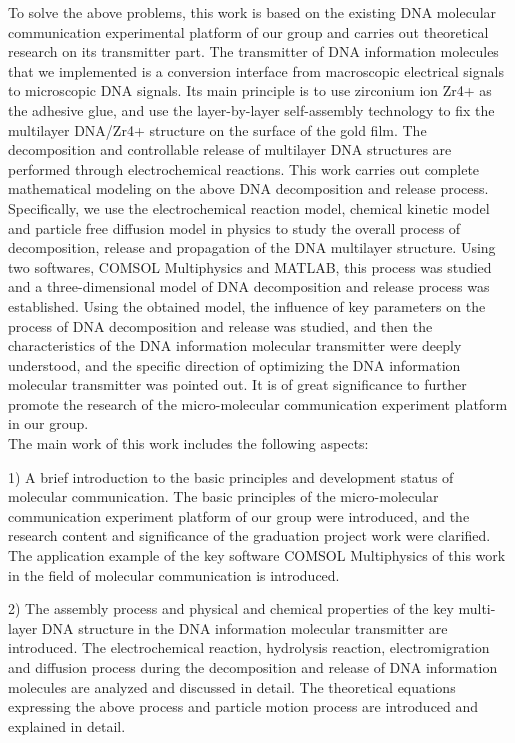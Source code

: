 \begin{abstract*}
To solve the above problems, this work is based on the existing DNA molecular communication experimental platform of our group and carries out theoretical research on its transmitter part. The transmitter of DNA information molecules that we implemented is a conversion interface from macroscopic electrical signals to microscopic DNA signals. Its main principle is to use zirconium ion Zr4+ as the adhesive glue, and use the layer-by-layer self-assembly technology to fix the multilayer DNA/Zr4+ structure on the surface of the gold film. The decomposition and controllable release of multilayer DNA structures are performed through electrochemical reactions. This work carries out complete mathematical modeling on the above DNA decomposition and release process. Specifically, we use the electrochemical reaction model, chemical kinetic model and particle free diffusion model in physics to study the overall process of decomposition, release and propagation of the DNA multilayer structure. Using two softwares, COMSOL Multiphysics and MATLAB, this process was studied and a three-dimensional model of DNA decomposition and release process was established. Using the obtained model, the influence of key parameters on the process of DNA decomposition and release was studied, and then the characteristics of the DNA information molecular transmitter were deeply understood, and the specific direction of optimizing the DNA information molecular transmitter was pointed out. It is of great significance to further promote the research of the micro-molecular communication experiment platform in our group.\\

The main work of this work includes the following aspects:

1) A brief introduction to the basic principles and development status of molecular communication. The basic principles of the micro-molecular communication experiment platform of our group were introduced, and the research content and significance of the graduation project work were clarified. The application example of the key software COMSOL Multiphysics of this work in the field of molecular communication is introduced.

2) The assembly process and physical and chemical properties of the key multi-layer DNA structure in the DNA information molecular transmitter are introduced. The electrochemical reaction, hydrolysis reaction, electromigration and diffusion process during the decomposition and release of DNA information molecules are analyzed and discussed in detail. The theoretical equations expressing the above process and particle motion process are introduced and explained in detail.


\end{abstract*}
